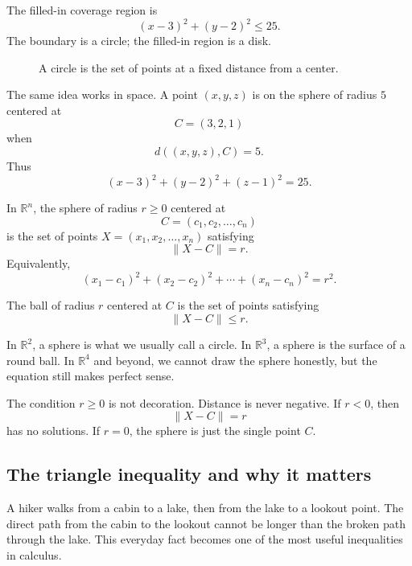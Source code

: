 The filled-in coverage region is
\[
    (x-3)^2+(y-2)^2\leq 25.
\]
The boundary is a circle; the filled-in region is a disk.

\begin{figure}[h]
\centering
{}
\caption{A circle is the set of points at a fixed distance from a center.}
\end{figure}

The same idea works in space.  A point \((x,y,z)\) is on the sphere of radius \(5\)
centered at
\[
    C=(3,2,1)
\]
when
\[
    d((x,y,z),C)=5.
\]
Thus
\[
    (x-3)^2+(y-2)^2+(z-1)^2=25.
\]

\begin{definition}
In \(\mathbb R^n\), the sphere of radius \(r\geq 0\) centered at
\[
    C=(c_1,c_2,\ldots,c_n)
\]
is the set of points \(X=(x_1,x_2,\ldots,x_n)\) satisfying
\[
    \|X-C\|=r.
\]
Equivalently,
\[
    (x_1-c_1)^2+(x_2-c_2)^2+\cdots+(x_n-c_n)^2=r^2.
\]

The ball of radius \(r\) centered at \(C\) is the set of points satisfying
\[
    \|X-C\|\leq r.
\]
\end{definition}

In \(\mathbb R^2\), a sphere is what we usually call a circle.  In \(\mathbb R^3\), a
sphere is the surface of a round ball.  In \(\mathbb R^4\) and beyond, we cannot draw
the sphere honestly, but the equation still makes perfect sense.

The condition \(r\geq 0\) is not decoration.  Distance is never negative.  If \(r<0\),
then
\[
    \|X-C\|=r
\]
has no solutions.  If \(r=0\), the sphere is just the single point \(C\).

\subsection{The triangle inequality and why it matters}

A hiker walks from a cabin to a lake, then from the lake to a lookout point.  The direct
path from the cabin to the lookout cannot be longer than the broken path through the
lake.  This everyday fact becomes one of the most useful inequalities in calculus.

